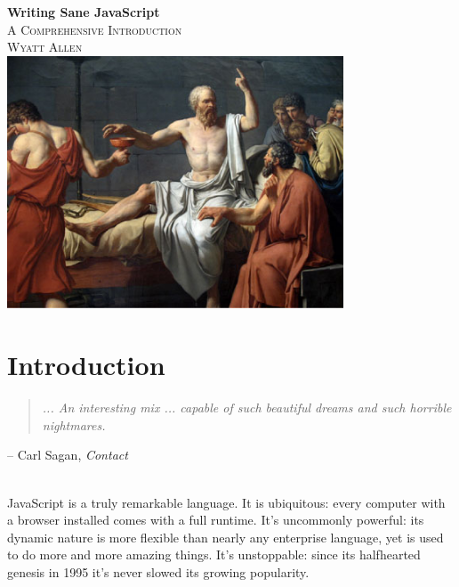 \documentclass[11pt,letter]{book}
\begin{document}
    \frontmatter

    \begin{titlepage}
        \begin{center}
            { \huge \bfseries Writing Sane JavaScript}\\[0.4cm]
            \textsc{\Large A Comprehensive Introduction}\\[0.5cm]
            \textsc{Wyatt Allen}
            \HRule \\[1.2cm]
            \includegraphics[width=10cm]{socrates-hemlock}
            \vfill
        \end{center}
    \end{titlepage}
    
    \tableofcontents 
    
    \chapter{Introduction}
    \begin{quote}
        \emph{
            ... An interesting mix ... capable of such beautiful dreams and such horrible 
            nightmares.
        }
    \end{quote}
    \begin{flushright}
        -- Carl Sagan, \emph{Contact}
    \end{flushright}
    \HRule \\[1.2cm]
    
    JavaScript is a truly remarkable language. It is ubiquitous: every computer with a browser 
    installed comes with a full runtime. It's uncommonly powerful: its dynamic nature is more 
    flexible than nearly any enterprise language, yet is used to do more and more amazing things.
    It's unstoppable: since its halfhearted genesis in 1995 it's never slowed its growing 
    popularity.
    
\end{document}
